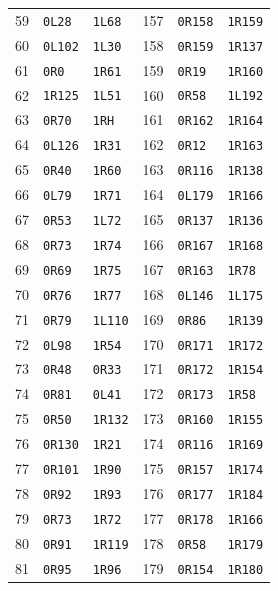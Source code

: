 \begin{longtable}{rll@{\qquad}rll}
59 & \texttt{0L28} & \texttt{1L68} & 157 & \texttt{0R158} & \texttt{1R159}\\
60 & \texttt{0L102} & \texttt{1L30} & 158 & \texttt{0R159} & \texttt{1R137}\\
61 & \texttt{0R0} & \texttt{1R61} & 159 & \texttt{0R19} & \texttt{1R160}\\
62 & \texttt{1R125} & \texttt{1L51} & 160 & \texttt{0R58} & \texttt{1L192}\\
63 & \texttt{0R70} & \texttt{1RH} & 161 & \texttt{0R162} & \texttt{1R164}\\
64 & \texttt{0L126} & \texttt{1R31} & 162 & \texttt{0R12} & \texttt{1R163}\\
65 & \texttt{0R40} & \texttt{1R60} & 163 & \texttt{0R116} & \texttt{1R138}\\
66 & \texttt{0L79} & \texttt{1R71} & 164 & \texttt{0L179} & \texttt{1R166}\\
67 & \texttt{0R53} & \texttt{1L72} & 165 & \texttt{0R137} & \texttt{1R136}\\
68 & \texttt{0R73} & \texttt{1R74} & 166 & \texttt{0R167} & \texttt{1R168}\\
69 & \texttt{0R69} & \texttt{1R75} & 167 & \texttt{0R163} & \texttt{1R78}\\
70 & \texttt{0R76} & \texttt{1R77} & 168 & \texttt{0L146} & \texttt{1L175}\\
71 & \texttt{0R79} & \texttt{1L110} & 169 & \texttt{0R86} & \texttt{1R139}\\
72 & \texttt{0L98} & \texttt{1R54} & 170 & \texttt{0R171} & \texttt{1R172}\\
73 & \texttt{0R48} & \texttt{0R33} & 171 & \texttt{0R172} & \texttt{1R154}\\
74 & \texttt{0R81} & \texttt{0L41} & 172 & \texttt{0R173} & \texttt{1R58}\\
75 & \texttt{0R50} & \texttt{1R132} & 173 & \texttt{0R160} & \texttt{1R155}\\
76 & \texttt{0R130} & \texttt{1R21} & 174 & \texttt{0R116} & \texttt{1R169}\\
77 & \texttt{0R101} & \texttt{1R90} & 175 & \texttt{0R157} & \texttt{1R174}\\
78 & \texttt{0R92} & \texttt{1R93} & 176 & \texttt{0R177} & \texttt{1R184}\\
79 & \texttt{0R73} & \texttt{1R72} & 177 & \texttt{0R178} & \texttt{1R166}\\
80 & \texttt{0R91} & \texttt{1R119} & 178 & \texttt{0R58} & \texttt{1R179}\\
81 & \texttt{0R95} & \texttt{1R96} & 179 & \texttt{0R154} & \texttt{1R180}\\

\end{longtable}
